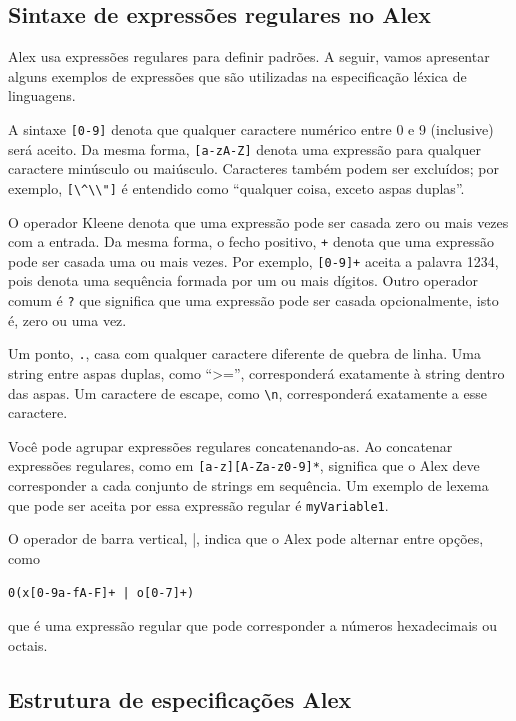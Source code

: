 \subsection{Sintaxe de expressões regulares no Alex}

Alex usa expressões regulares para definir padrões. A seguir, vamos
apresentar alguns exemplos de expressões que são utilizadas na
especificação léxica de linguagens.

A sintaxe \verb|[0-9]| denota que qualquer
caractere numérico entre 0 e 9 (inclusive) será aceito. Da mesma
forma, \verb|[a-zA-Z]| denota uma expressão para
qualquer caractere minúsculo ou maiúsculo. Caracteres também podem
ser excluídos; por exemplo, \verb|[\^\\"]| é
entendido como ``qualquer coisa, exceto aspas duplas''.

O operador Kleene denota que uma expressão pode ser casada zero ou
mais vezes com a entrada. Da mesma forma, o fecho positivo,
\verb|+| denota que uma expressão pode ser casada
uma ou mais vezes. Por exemplo, \verb|[0-9]+|
aceita a palavra 1234, pois denota uma sequência formada por um ou
mais dígitos. Outro operador comum é \verb|?| que
significa que uma expressão pode ser casada opcionalmente, isto é,
zero ou uma vez.

Um ponto, \verb|.|, casa com qualquer caractere
diferente de quebra de linha. Uma string entre aspas duplas, como
``>='', corresponderá exatamente à string dentro das
aspas. Um caractere de escape, como \verb|\n|, corresponderá exatamente a
esse caractere.

Você pode agrupar expressões regulares concatenando-as.
Ao concatenar expressões
regulares, como em \verb|[a-z][A-Za-z0-9]*|,
significa que o Alex deve corresponder a cada conjunto de strings em
sequência. Um exemplo de lexema que pode ser aceita por essa
expressão regular é \verb|myVariable1|.

O operador de barra vertical, \verb|||, indica que o Alex pode
alternar entre opções, como

\begin{verbatim}
0(x[0-9a-fA-F]+ | o[0-7]+)
\end{verbatim}

que é uma expressão regular que pode corresponder a números
hexadecimais ou octais.

\subsection{Estrutura de especificações Alex}

